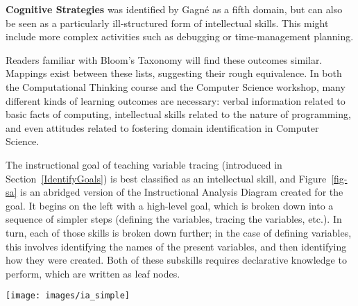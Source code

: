 \textbf{Cognitive Strategies} was identified by Gagn\'{e} as a fifth domain, but can also be seen as a particularly ill-structured form of intellectual skills.
This might include more complex activities such as debugging or time-management planning.

Readers familiar with Bloom's Taxonomy will find these outcomes similar.
Mappings exist between these lists, suggesting their rough equivalence.
In both the Computational Thinking course and the Computer Science workshop, many different kinds of learning outcomes are necessary: verbal information related to basic facts of computing, intellectual skills related to the nature of programming, and even attitudes related to fostering domain identification in Computer Science.

The instructional goal of teaching variable tracing
(introduced in Section~\ref{IdentifyGoals}) is best classified as an intellectual skill, and Figure~\ref{fig-sa} is an abridged version of the Instructional Analysis Diagram created for the goal.
It begins on the left with a high-level goal, which is broken down into a sequence of simpler steps (defining the variables, tracing the variables, etc.).
In turn, each of those skills is broken down further; in the case of defining variables, this involves identifying the names of the present variables, and then identifying how they were created.
Both of these subskills requires declarative knowledge to perform, which are written as leaf nodes.

\begin{figure*}
\begin{center}
	\texttt{[image: images/ia\_simple]}
\end{center}
\vspace{-\bigskipamount}
\caption{Partial Skill Analysis Diagram}
\label{fig-sa}
\end{figure*}

